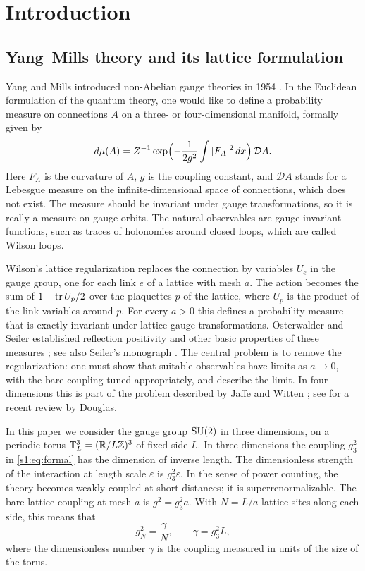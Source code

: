 \chapter{Introduction}\label{s1:chapter}

\section{Yang--Mills theory and its lattice formulation}\label{s1:background}

Yang and Mills introduced non-Abelian gauge theories in 1954 \cite{YangMills1954}. In the Euclidean formulation of the quantum theory, one would like to define a probability measure on connections $A$ on a three- or four-dimensional manifold, formally given by
\begin{equation}\label{s1:eq:formal}
 d\mu(A)=Z^{-1}\exp\Bigl(-\frac{1}{2g^2}\int|F_A|^2\,dx\Bigr)\,\mathcal DA.
\end{equation}
Here $F_A$ is the curvature of $A$, $g$ is the coupling constant, and $\mathcal DA$ stands for a Lebesgue measure on the infinite-dimensional space of connections, which does not exist. The measure should be invariant under gauge transformations, so it is really a measure on gauge orbits. The natural observables are gauge-invariant functions, such as traces of holonomies around closed loops, which are called Wilson loops.

Wilson's lattice regularization \cite{Wilson1974} replaces the connection by variables $U_e$ in the gauge group, one for each link $e$ of a lattice with mesh $a$. The action becomes the sum of $1-\operatorname{tr} U_p/2$ over the plaquettes $p$ of the lattice, where $U_p$ is the product of the link variables around $p$. For every $a>0$ this defines a probability measure that is exactly invariant under lattice gauge transformations. Osterwalder and Seiler established reflection positivity and other basic properties of these measures \cite{OsterwalderSeiler1978}; see also Seiler's monograph \cite{Seiler1982}. The central problem is to remove the regularization: one must show that suitable observables have limits as $a\to0$, with the bare coupling tuned appropriately, and describe the limit. In four dimensions this is part of the problem described by Jaffe and Witten \cite{JaffeWitten2006}; see \cite{Douglas2026} for a recent review by Douglas.

In this paper we consider the gauge group $\mathrm{SU}(2)$ in three dimensions, on a periodic torus $\mathbb T_L^3=(\mathbb R/L\mathbb Z)^3$ of fixed side $L$. In three dimensions the coupling $g_3^2$ in \eqref{s1:eq:formal} has the dimension of inverse length. The dimensionless strength of the interaction at length scale $\varepsilon$ is $g_3^2\varepsilon$. In the sense of power counting, the theory becomes weakly coupled at short distances; it is superrenormalizable. The bare lattice coupling at mesh $a$ is $g^2=g_3^2a$. With $N=L/a$ lattice sites along each side, this means that
\begin{equation}\label{s1:eq:coupling}
 g_N^2=\frac{\gamma}{N},\qquad \gamma=g_3^2L,
\end{equation}
where the dimensionless number $\gamma$ is the coupling measured in units of the size of the torus.


